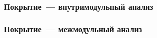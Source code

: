 \documentclass[hyperref={pdfpagelabels=false}]{beamer}
\begin{document}
\begin{frame}
\frametitle{Покрытие~--- внутримодульный анализ}
\begin{figure}[h]
\end{figure}
\end{frame}

\begin{frame}
\frametitle{Покрытие~--- межмодульный анализ}
\begin{figure}[h]
\end{figure}
\end{frame}
\end{document}
